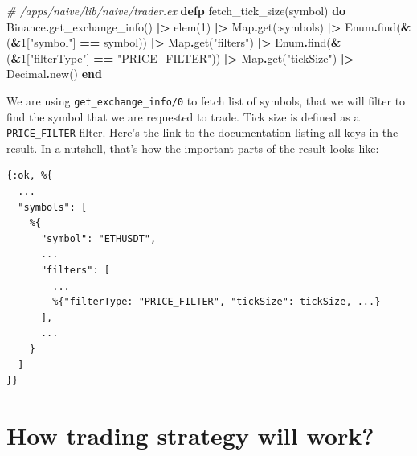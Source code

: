 \documentclass[
]{book}
\newenvironment{Shaded}{\begin{snugshade}}{\end{snugshade}}
\newcommand{\CommentTok}[1]{\textcolor[rgb]{0.56,0.35,0.01}{\textit{#1}}}
\newcommand{\ConstantTok}[1]{\textcolor[rgb]{0.00,0.00,0.00}{#1}}
\newcommand{\DecValTok}[1]{\textcolor[rgb]{0.00,0.00,0.81}{#1}}
\newcommand{\KeywordTok}[1]{\textcolor[rgb]{0.13,0.29,0.53}{\textbf{#1}}}
\newcommand{\NormalTok}[1]{#1}
\newcommand{\OperatorTok}[1]{\textcolor[rgb]{0.81,0.36,0.00}{\textbf{#1}}}
\newcommand{\StringTok}[1]{\textcolor[rgb]{0.31,0.60,0.02}{#1}}
\newcommand{\VariableTok}[1]{\textcolor[rgb]{0.00,0.00,0.00}{#1}}
\begin{document}
\begin{Shaded}
\begin{Highlighting}[]
  \CommentTok{\# /apps/naive/lib/naive/trader.ex}
  \KeywordTok{defp}\NormalTok{ fetch\_tick\_size(symbol) }\KeywordTok{do}
    \ConstantTok{Binance}\OperatorTok{.}\NormalTok{get\_exchange\_info()}
    \OperatorTok{|\textgreater{}}\NormalTok{ elem(}\DecValTok{1}\NormalTok{)}
    \OperatorTok{|\textgreater{}} \ConstantTok{Map}\OperatorTok{.}\NormalTok{get(}\VariableTok{:symbols}\NormalTok{)}
    \OperatorTok{|\textgreater{}} \ConstantTok{Enum}\OperatorTok{.}\NormalTok{find(}\OperatorTok{\&}\NormalTok{(}\OperatorTok{\&}\DecValTok{1}\NormalTok{[}\StringTok{"symbol"}\NormalTok{] }\OperatorTok{==}\NormalTok{ symbol))}
    \OperatorTok{|\textgreater{}} \ConstantTok{Map}\OperatorTok{.}\NormalTok{get(}\StringTok{"filters"}\NormalTok{)}
    \OperatorTok{|\textgreater{}} \ConstantTok{Enum}\OperatorTok{.}\NormalTok{find(}\OperatorTok{\&}\NormalTok{(}\OperatorTok{\&}\DecValTok{1}\NormalTok{[}\StringTok{"filterType"}\NormalTok{] }\OperatorTok{==} \StringTok{"PRICE\_FILTER"}\NormalTok{))}
    \OperatorTok{|\textgreater{}} \ConstantTok{Map}\OperatorTok{.}\NormalTok{get(}\StringTok{"tickSize"}\NormalTok{)}
    \OperatorTok{|\textgreater{}} \ConstantTok{Decimal}\OperatorTok{.}\NormalTok{new()}
  \KeywordTok{end}
\end{Highlighting}
\end{Shaded}

We are using \texttt{get\_exchange\_info/0} to fetch list of symbols, that we will filter to find the symbol that we are requested to trade. Tick size is defined as a \texttt{PRICE\_FILTER} filter. Here's the \href{https://github.com/binance/binance-spot-api-docs/blob/master/rest-api.md\#exchange-information}{link} to the documentation listing all keys in the result. In a nutshell, that's how the important parts of the result looks like:

\begin{verbatim}
{:ok, %{
  ...
  "symbols": [
    %{
      "symbol": "ETHUSDT",
      ...
      "filters": [
        ...
        %{"filterType: "PRICE_FILTER", "tickSize": tickSize, ...}
      ],
      ...
    }
  ]
}}
\end{verbatim}

\hypertarget{how-trading-strategy-will-work}{%
\section{How trading strategy will work?}\label{how-trading-strategy-will-work}}
\end{document}
